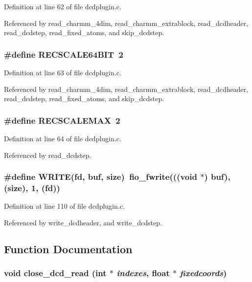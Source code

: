 Definition at line 62 of file dcdplugin.c.

Referenced by read\_\-charmm\_\-4dim, read\_\-charmm\_\-extrablock, read\_\-dcdheader, read\_\-dcdstep, read\_\-fixed\_\-atoms, and skip\_\-dcdstep.
\subsubsection{\setlength{\rightskip}{0pt plus 5cm}\#define RECSCALE64BIT\ 2}\label{dcdplugin_8c_a2}




Definition at line 63 of file dcdplugin.c.

Referenced by read\_\-charmm\_\-4dim, read\_\-charmm\_\-extrablock, read\_\-dcdheader, read\_\-dcdstep, read\_\-fixed\_\-atoms, and skip\_\-dcdstep.
\subsubsection{\setlength{\rightskip}{0pt plus 5cm}\#define RECSCALEMAX\ 2}\label{dcdplugin_8c_a3}




Definition at line 64 of file dcdplugin.c.

Referenced by read\_\-dcdstep.
\subsubsection{\setlength{\rightskip}{0pt plus 5cm}\#define WRITE(fd, buf, size)\ fio\_\-fwrite(((void $\ast$) buf), (size), 1, (fd))}\label{dcdplugin_8c_a21}




Definition at line 110 of file dcdplugin.c.

Referenced by write\_\-dcdheader, and write\_\-dcdstep.

\subsection{Function Documentation}
\subsubsection{\setlength{\rightskip}{0pt plus 5cm}void close\_\-dcd\_\-read (int $\ast$ {\em indexes}, float $\ast$ {\em fixedcoords})\hspace{0.3cm}{\tt  [static]}}\label{dcdplugin_8c_a34}




